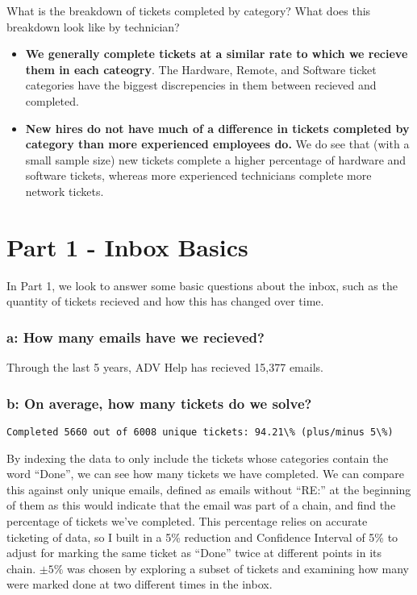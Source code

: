 \documentclass[11pt]{article}
\begin{document}
What is the breakdown of tickets completed by category? What does this
breakdown look like by technician?

\begin{itemize}
\item
  \textbf{We generally complete tickets at a similar rate to which we
  recieve them in each cateogry}. The Hardware, Remote, and Software
  ticket categories have the biggest discrepencies in them between
  recieved and completed. 
\item
  \textbf{New hires do not have much of a difference in tickets
  completed by category than more experienced employees do.} We do see
  that (with a small sample size) new tickets complete a higher
  percentage of hardware and software tickets, whereas more experienced
  technicians complete more network tickets.
\end{itemize}


    \hypertarget{part-1---inbox-basics}{%
\section{Part 1 - Inbox Basics}\label{part-1---inbox-basics}}

In Part 1, we look to answer some basic questions about the inbox, such
as the quantity of tickets recieved and how this has changed over time.

\hypertarget{a-how-many-emails-have-we-recieved}{%
\subsubsection{a: How many emails have we
recieved?}\label{a-how-many-emails-have-we-recieved}}


    Through the last 5 years, ADV Help has recieved 15,377 emails.

    \hypertarget{b-on-average-how-many-tickets-do-we-solve}{%
\subsubsection{b: On average, how many tickets do we
solve?}\label{b-on-average-how-many-tickets-do-we-solve}}

    \begin{Verbatim}[commandchars=\\\{\}]
Completed 5660 out of 6008 unique tickets: 94.21\% (plus/minus 5\%)
    \end{Verbatim}

    By indexing the data to only include the tickets whose categories
contain the word ``Done'', we can see how many tickets we have
completed. We can compare this against only unique emails, defined as
emails without ``RE:'' at the beginning of them as this would indicate
that the email was part of a chain, and find the percentage of tickets
we've completed. This percentage relies on accurate ticketing of data,
so I built in a 5\% reduction and Confidence Interval of 5\% to adjust
for marking the same ticket as ``Done'' twice at different points in its
chain. \(\pm 5\%\) was chosen by exploring a subset of tickets and
examining how many were marked done at two different times in the inbox.
\end{document}
